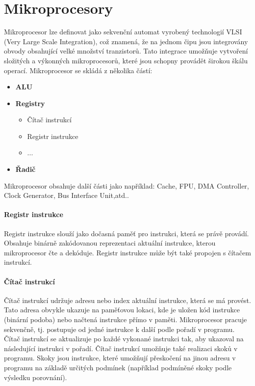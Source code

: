 \section{Mikroprocesory}
Mikroprocesor lze definovat jako sekvenční automat vyrobený technologií VLSI (Very Large Scale Integration), což znamená, že na jednom čipu jsou integrovány obvody obsahující velké množství tranzistorů. Tato integrace umožňuje vytvoření složitých a výkonných mikroprocesorů, které jsou schopny provádět širokou škálu operací. Mikroprocesor se skládá z několika částí:
\begin{itemize}
    \item \textbf{ALU}
    \item \textbf{Registry}
        \begin{itemize}
            \item Čítač instrukcí
            \item Registr instrukce
            \item ...
        \end{itemize}
    \item \textbf{Řadič}
\end{itemize}
Mikroprocesor obsahuje další části jako například: Cache, FPU, DMA Controller, Clock Generator, Bus Interface Unit,atd..

\paragraph{Registr instrukce}
Registr instrukce slouží jako dočasná paměť pro instrukci, která se právě provádí. Obsahuje binárně zakódovanou reprezentaci aktuální instrukce, kterou mikroprocesor čte a dekóduje. Registr instrukce může být také propojen s čítačem instrukcí.

\paragraph{Čítač instrukcí}
Čítač instrukcí udržuje adresu nebo index aktuální instrukce, která se má provést. Tato adresa obvykle ukazuje na paměťovou lokaci, kde je uložen kód instrukce (binární podoba) nebo načtená instrukce přímo v paměti. Mikroprocesor pracuje sekvenčně, tj. postupuje od jedné instrukce k další podle pořadí v programu. Čítač instrukcí se aktualizuje po každé vykonané instrukci tak, aby ukazoval na následující instrukci v pořadí. Čítač instrukcí umožňuje také realizaci skoků v programu. Skoky jsou instrukce, které umožňují přeskočení na jinou adresu v programu na základě určitých podmínek (například podmíněné skoky podle výsledku porovnání).

